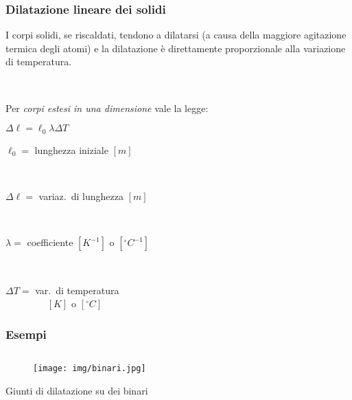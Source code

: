 \documentclass[]{beamer}
\theoremstyle{plain}
\begin{document}
\begin{frame}
\frametitle{Dilatazione lineare dei solidi}
I corpi solidi, se riscaldati, tendono a dilatarsi (a causa della maggiore agitazione termica degli atomi) e \alert{la dilatazione è direttamente proporzionale alla variazione di temperatura}.\pause

~

Per \emph{corpi estesi in una dimensione} vale la legge:
\begin{center}
\colorbox{blue!30}{$ \Delta \ell = \ell_0 \lambda \Delta T  $}
\end{center}
  \begin{multicols}{2}
$ \ell_0 = $ lunghezza iniziale $ [m] $

~

$ \Delta \ell = $ variaz.~di lunghezza $ [m] $

~

$ \lambda = $ coefficiente $ [K^{-1}] $ o $ [^\circ C^{-1}] $

~

$ \Delta T = $ var.~di temperatura \\~~~~~~~~ $ [K] $ o $ [ ^\circ C] $
  \end{multicols}
\end{frame}





\begin{frame}
\frametitle{Esempi}
\begin{columns}
\begin{column}{0.3\textwidth}
\begin{figure}
\texttt{[image: img/binari.jpg]}
\end{figure}
Giunti di dilatazione su dei binari
\end{column}
\begin{column}{0.3\textwidth}
\end{column}
\begin{column}{0.3\textwidth}
\end{column}
\end{columns}
\end{frame}
\end{document}
